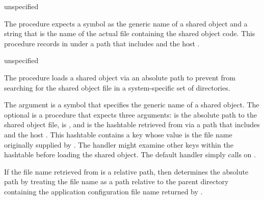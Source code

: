 \begin{procedure}
\end{procedure}
\returns{} unspecified

The  procedure expects a symbol
 as the generic name of a shared object and
a string  that is the
name of the actual file containing the shared object code.
This procedure records  in  under a
path that includes  and the host .

\begin{procedure}
\end{procedure}
\returns{} unspecified

The  procedure loads a shared object via an
absolute path to prevent  from searching for the
shared object file in a system-specific set of directories.

The  argument is a symbol that specifies the generic name of a
shared object.
The optional  is a procedure that expects three arguments:
 is the absolute path to the shared object file,
 is , and  is the hashtable
retrieved from  via a path that includes
 and the host .
This hashtable contains a key  whose value
is the file name originally supplied by .
The handler might examine other keys within the hashtable before
loading the shared object.
The default handler simply calls  on .

If the file name retrieved from  is a relative path,
then  determines the absolute path by
treating the file name as a path relative to the parent directory
containing the application configuration file name returned by .
